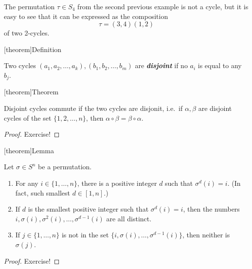 \documentclass[12pt]{report}
\theoremstyle{definition}
\begin{document}
\begin{ex}
    The permutation $\tau \in{}S_4$ from the second previous example is not a cycle,
    but it is easy to see that it can be expressed as the composition\[
        \tau = (3,4)(1,2)
    \]of two 2-cycles.
\end{ex}

[theorem]{Definition}
\begin{disjoint cycles}
    Two cycles $(a_1, a_2, \ldots, a_k), (b_1, b_2, \ldots, b_m)$ are \textbf{\emph{disjoint}}
    if no $a_i$ is equal to any $b_j$.
\end{disjoint cycles}

[theorem]{Theorem}
\begin{disjoint cycles commute}
    Disjoint cycles commute if the two cycles are disjonit, i.e.\
    if $\alpha, \beta$ are disjoint cycles of the set $\{1, 2, \ldots, n\}$,
    then $\alpha \circ \beta = \beta \circ \alpha$.
\end{disjoint cycles commute}

\begin{proof}
    Exercise!
\end{proof}

[theorem]{Lemma}
\begin{permutation's lemma}
    Let $\sigma \in S^{n}$ be a permutation.
    \begin{enumerate}
        \item For any $i \in \{1, \ldots, n\}$, there is a positive integer $d$
            such that $\sigma^{d}(i) = i$. (In fact, such smallest $d \in [1, n]$.)

        \item If $d$ is the smallest positive integer such that $\sigma^{d}(i) = i$,
            then the numbers $i, \sigma(i), \sigma^{2}(i), \ldots, \sigma^{d-1}(i)$
            are all distinct.

        \item If $j \in \{1, \ldots, n\}$ is not in the set $\{i, \sigma(i), \ldots,
            \sigma^{d-1}(i)\}$, then neither is $\sigma(j)$.
    \end{enumerate}
\end{permutation's lemma}

\begin{proof}
    Exercise!
\end{proof}
\end{document}

